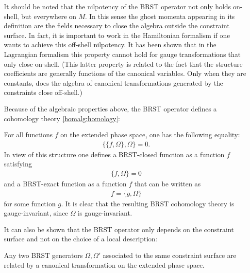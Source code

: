     \begin{remark}
        It should be noted that the nilpotency of the BRST operator not only holds on-shell, but everywhere on $M$. In this sense the ghost momenta appearing in its definition are the fields necessary to close the algebra outside the constraint surface. In fact, it is important to work in the Hamiltonian formalism if one wants to achieve this off-shell nilpotency. It has been shown that in the Lagrangian formalism this property cannot hold for gauge transformations that only close on-shell. (This latter property is related to the fact that the structure coefficients are generally functions of the canonical variables. Only when they are constants, does the algebra of canonical transformations generated by the constraints close off-shell.)
    \end{remark}

    Because of the algebraic properties above, the BRST operator defines a cohomology theory \ref{homalg:homology}:
    \begin{property}
        For all functions $f$ on the extended phase space, one has the following equality:
        \begin{gather}
            \{\{f,\Omega\},\Omega\} = 0.
        \end{gather}
        In view of this structure one defines a BRST-closed function as a function $f$ satisfying
        \begin{gather}
            \{f,\Omega\} = 0
        \end{gather}
        and a BRST-exact function as a function $f$ that can be written as
        \begin{gather}
            f = \{g,\Omega\}
        \end{gather}
        for some function $g$. It is clear that the resulting BRST cohomology theory is gauge-invariant, since $\Omega$ is gauge-invariant.
    \end{property}
    It can also be shown that the BRST operator only depends on the constraint surface and not on the choice of a local description:
    \begin{property}[Uniqueness]
        Any two BRST generators $\Omega,\Omega'$ associated to the same constraint surface are related by a canonical transformation on the extended phase space.
    \end{property}

